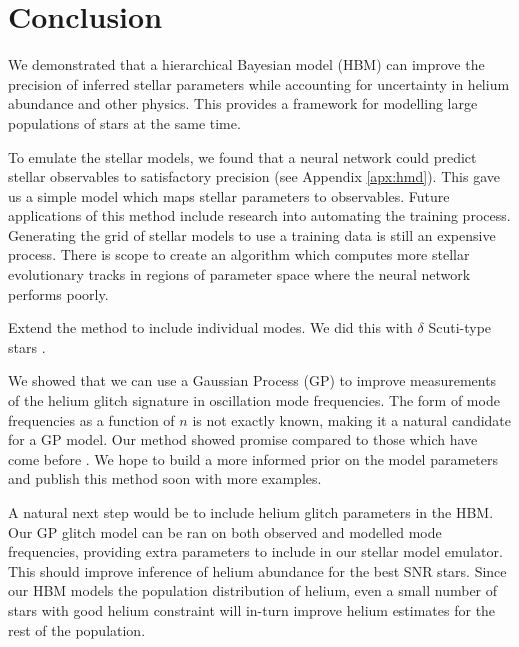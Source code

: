 %
%
%
%
%
\chapter{Conclusion}

We demonstrated that a hierarchical Bayesian model (HBM) can improve the precision of inferred stellar parameters while accounting for uncertainty in helium abundance and other physics. This provides a framework for modelling large populations of stars at the same time. 

To emulate the stellar models, we found that a neural network could predict stellar observables to satisfactory precision (see Appendix \ref{apx:hmd}). This gave us a simple model which maps stellar parameters to observables. Future applications of this method include research into automating the training process. Generating the grid of stellar models to use a training data is still an expensive process. There is scope to create an algorithm which computes more stellar evolutionary tracks in regions of parameter space where the neural network performs poorly.

Extend the method to include individual modes. We did this with \(\delta\) Scuti-type stars \citep{Scutt.Murphy.ea2023}.

We showed that we can use a Gaussian Process (GP) to improve measurements of the helium glitch signature in oscillation mode frequencies. The form of mode frequencies as a function of \(n\) is not exactly known, making it a natural candidate for a GP model. Our method showed promise compared to those which have come before \citep[e.g.][]{Verma.Raodeo.ea2019}. We hope to build a more informed prior on the model parameters and publish this method soon with more examples.

A natural next step would be to include helium glitch parameters in the HBM. Our GP glitch model can be ran on both observed and modelled mode frequencies, providing extra parameters to include in our stellar model emulator. This should improve inference of helium abundance for the best SNR stars. Since our HBM models the population distribution of helium, even a small number of stars with good helium constraint will in-turn improve helium estimates for the rest of the population.

